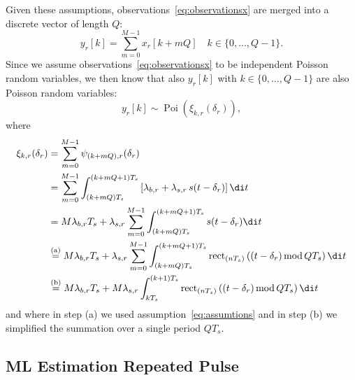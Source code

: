\noindent
Given these assumptions, observations~\eqref{eq:observationsx} are merged into a discrete vector of length \(Q\):
\begin{equation}
y_r[k]=\sum_{m=0}^{M-1}x_r[k+mQ] \quad k\in\{0,\ldots,Q-1\}.
\label{eq:aparently}
\end{equation}
Since we assume observations~\eqref{eq:observationsx} to be independent Poisson random variables, we then know that also \(y_r[k]\) with \(k\in\{0,\ldots,Q-1\}\) are also Poisson random variables:
\begin{equation}
y_r[k]\sim
\operatorname{Poi}
\left(\xi_{k,r}(\delta_r)\right),
\end{equation}
where
\begin{equation}
\begin{aligned}
\xi_{k,r}(\delta_r)
& = \sum_{m=0}^{M-1}\psi_{(k+mQ),r}(\delta_r)\\
& = \sum_{m=0}^{M-1}\int_{(k+mQ)T_s}^{(k+mQ+1)T_s} \left[ \lambda_{b,r}+\lambda_{s,r} \, s(t-\delta_{r}) \right] \di t\\
& = M\lambda_{b,r} T_s+\lambda_{s,r} \sum_{m=0}^{M-1}\int_{(k+mQ)T_s}^{(k+mQ+1)T_s}  s(t-\delta_{r}) \di t\\
& \overset{\text{(a)}}{=}  M\lambda_{b,r} T_s+\lambda_{s,r} \sum_{m=0}^{M-1}\int_{(k+mQ)T_s}^{(k+mQ+1)T_s}  \operatorname{rect}_{(nT_s)} \left((t-\delta_r) \,\text{mod}\, QT_s\right) \di t\\
& \overset{\text{(b)}}{=}  M\lambda_{b,r} T_s+M\lambda_{s,r} \int_{kT_s}^{(k+1)T_s}  \operatorname{rect}_{(nT_s)} \left((t-\delta_r) \,\text{mod}\, QT_s\right) \di t\\
\end{aligned}
\label{eq:position}
\end{equation}
and where in step (a) we used assumption~\eqref{eq:assumtions} and in step (b) we simplified the summation over a single period \(QT_s\).

\subsection{ML Estimation Repeated Pulse}\label{sub:MLestimation2}

